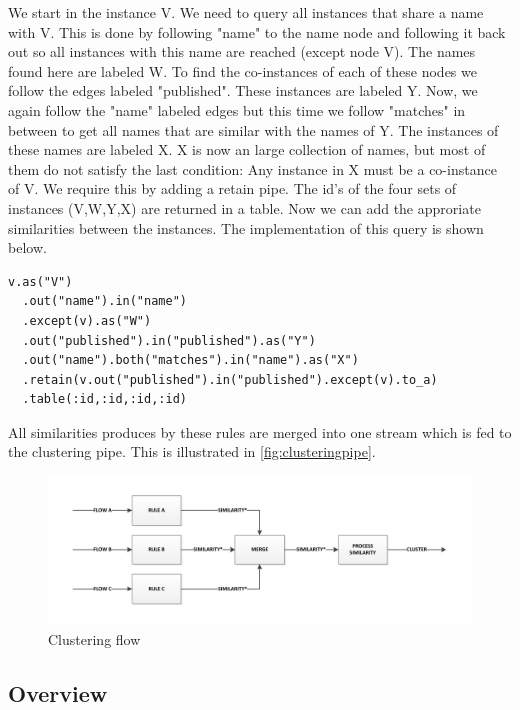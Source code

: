 We start in the instance V. We need to query all instances that share a name with V. This is done by following "name" to the name node and following it back out so all instances with this name are reached (except node V). The names found here are labeled W. To find the co-instances of each of these nodes we follow the edges labeled "published". These instances are labeled Y. Now, we again follow the "name" labeled edges but this time we follow "matches" in between to get all names that are similar with the names of Y. The instances of these names are labeled X. X is now an large collection of names, but most of them do not satisfy the last condition: Any instance in X must be a co-instance of V. We require this by adding a retain pipe. The id's of the four sets of instances (V,W,Y,X) are returned in a table. Now we can add the approriate similarities between the instances. The implementation of this query is shown below.

\begin{verbatim}
v.as("V")
  .out("name").in("name")
  .except(v).as("W")
  .out("published").in("published").as("Y")
  .out("name").both("matches").in("name").as("X")
  .retain(v.out("published").in("published").except(v).to_a)
  .table(:id,:id,:id,:id)
\end{verbatim}

All similarities produces by these rules are merged into one stream which is fed to the clustering pipe. This is illustrated in \autoref{fig:clusteringpipe}.

\begin{figure}[htb]
	\centering
		\includegraphics[width=1\textwidth]{fig/clusteringpipe}
	\caption{Clustering flow}
	\label{fig:clusteringpipe}
\end{figure}

\subsection{Overview}



